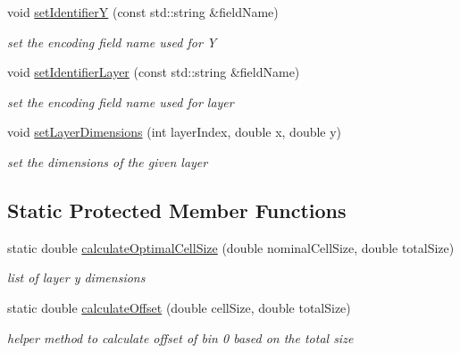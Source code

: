 \begin{DoxyCompactItemize}
void \hyperlink{class_d_d4hep_1_1_d_d_segmentation_1_1_tiled_layer_segmentation_ab9a0cd946f996399d9cabfecc4223abd}{setIdentifierY} (const std::string \&fieldName)
\begin{DoxyCompactList}\small\item\em set the encoding field name used for Y \item\end{DoxyCompactList}\item 
void \hyperlink{class_d_d4hep_1_1_d_d_segmentation_1_1_tiled_layer_segmentation_a3fed8d866ede1df684ec06344725b72c}{setIdentifierLayer} (const std::string \&fieldName)
\begin{DoxyCompactList}\small\item\em set the encoding field name used for layer \item\end{DoxyCompactList}\item 
void \hyperlink{class_d_d4hep_1_1_d_d_segmentation_1_1_tiled_layer_segmentation_a579736d34689d340d8d4dba0b30da4ba}{setLayerDimensions} (int layerIndex, double x, double y)
\begin{DoxyCompactList}\small\item\em set the dimensions of the given layer \item\end{DoxyCompactList}\end{DoxyCompactItemize}
\subsection*{Static Protected Member Functions}
\begin{DoxyCompactItemize}
\item 
static double \hyperlink{class_d_d4hep_1_1_d_d_segmentation_1_1_tiled_layer_segmentation_a3cbdc472b5f800c0a1fc99080f1fd72d}{calculateOptimalCellSize} (double nominalCellSize, double totalSize)
\begin{DoxyCompactList}\small\item\em list of layer y dimensions \item\end{DoxyCompactList}\item 
static double \hyperlink{class_d_d4hep_1_1_d_d_segmentation_1_1_tiled_layer_segmentation_a7c5f4fe56bec27c51187a8413fe96d38}{calculateOffset} (double cellSize, double totalSize)
\begin{DoxyCompactList}\small\item\em helper method to calculate offset of bin 0 based on the total size \item\end{DoxyCompactList}\end{DoxyCompactItemize}
